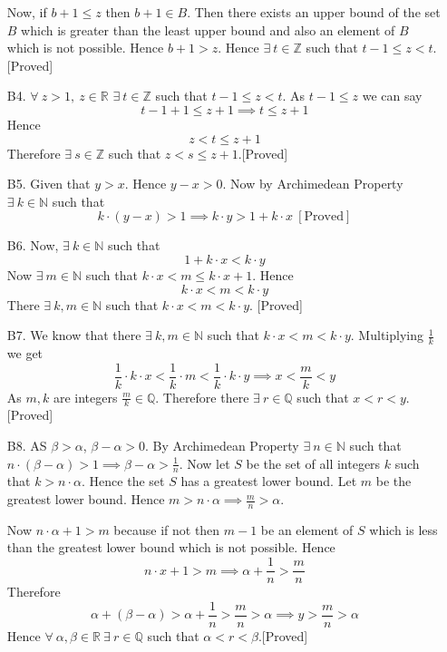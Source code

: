 \documentclass{article}
\begin{document}
\begin{enumerate}
		\hspace{1cm}Now, if $b+1\leq z$ then $b+1\in B$. Then there exists an upper bound of the set $B$ which is greater than the least upper bound and also an element of $B$ which is not possible. Hence $b+1>z$. Hence $\exists\ t\in\mathbb{Z}$ such that $t-1\leq z< t$.[Proved]
		\item[B4.] $\forall\ z>1,\ z\in\mathbb{R}$ $\exists\ t\in\mathbb{Z}$ such that $t-1\leq z< t$. As $t-1\leq z$ we can say$$t-1+1\leq z+1\implies t\leq z+1$$Hence $$z<t\leq z+1$$Therefore $\exists\ s\in\mathbb{Z}$ such that $z<s\leq z+1$.[Proved]
		\item[B5.] Given that $y>x$. Hence $y-x>0$. Now by Archimedean Property $\exists\ k\in\mathbb{N}$ such that $$k\cdot(y-x)>1\implies k\cdot y>1+k\cdot x\ [\text{Proved}] $$
		\item[B6.] Now, $\exists\ k\in\mathbb{N}$ such that $$1+k\cdot x<k\cdot y$$Now $\exists\ m\in\mathbb{N}$ such that $k\cdot x<m\leq k\cdot x+1$. Hence $$k\cdot x <m< k\cdot y$$There $\exists\ k,m\in\mathbb{N}$ such that $k\cdot x <m< k\cdot y$. [Proved]
		\item[B7.] We know that there $\exists\ k,m\in\mathbb{N}$ such that $k\cdot x <m< k\cdot y$. Multiplying $\frac1k$ we get$$\frac1k\cdot k\cdot x <\frac1k\cdot m< \frac1k\cdot k\cdot y\implies x<\frac{m}{k}<y$$As $m,k$ are integers $\frac{m}{k}\in\mathbb{Q}$. Therefore there $\exists\ r\in\mathbb{Q}$ such that $x <r< y$.[Proved]
		\item[B8.] AS $\beta>\alpha$, $\beta-\alpha>0$. By Archimedean Property $\exists\ n\in\mathbb{N}$ such that $n\cdot(\beta-\alpha)>1\implies \beta-\alpha>\frac1n$. Now let $S$ be the set of all integers $k$ such that $k>n\cdot \alpha$. Hence the set $S$ has a greatest lower bound. Let $m$ be the greatest lower bound. Hence $m>n\cdot \alpha\implies \frac{m}{n}>\alpha$.
		
		\hspace{1cm}Now $n\cdot \alpha+1> m$ because if not then $m-1$ be an element of $S$ which is less than the greatest lower bound which is not possible. Hence $$n\cdot x+1> m\implies\alpha+\frac1n>\frac{m}{n}$$Therefore $$\alpha+(\beta-\alpha)>\alpha+\frac{1}{n}>\frac{m}{n}>\alpha\implies y>\frac{m}{n}>\alpha$$Hence $\forall\ \alpha,\beta\in\mathbb{R}\ \exists\  r\in\mathbb{Q}$ such that $\alpha<r<\beta$.[Proved]
	\end{enumerate}
\end{document}
